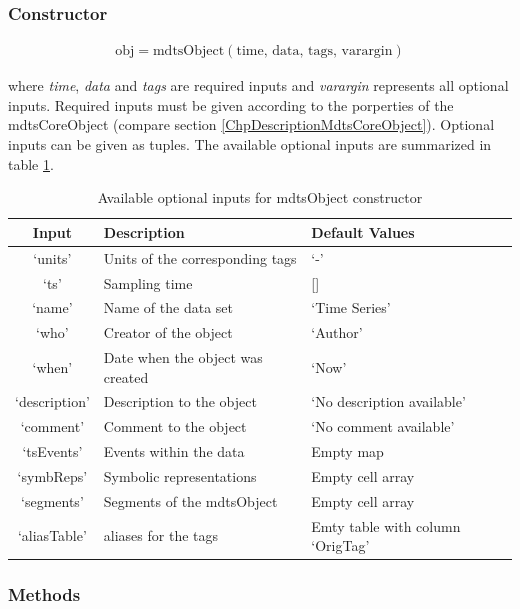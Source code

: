 \documentclass[a4]{scrreprt}
\begin{document}
\subsubsection{Constructor}

\begin{align*}
\text{obj} = \text{mdtsObject}(\text{time, }\text{data,  }\text{tags, }\text{varargin})
\end{align*}

where \textit{time}, \textit{data} and \textit{tags} are required inputs and \textit{varargin} represents all optional inputs. Required inputs must be given according to the porperties of the mdtsCoreObject (compare section \ref{ChpDescriptionMdtsCoreObject}). Optional inputs can be given as tuples. The available optional inputs are summarized in table \ref{TblMdtsConstructorInputs}.

\begin{table}[htbp]
	\centering
	\caption{Available optional inputs for mdtsObject constructor}
	\begin{tabular}{ | c | l | l |}
		\hline
		Input & Description & Default Values \\ \hline \hline
		`units' & Units of the corresponding tags & `-' \\ \hline
		`ts' & Sampling time & [] \\ \hline
		`name' & Name of the data set & `Time Series' \\ \hline
		`who' & Creator of the object & `Author' \\ \hline
		`when' & Date when the object was created & `Now' \\ \hline
		`description' & Description to the object & `No description available' \\ \hline
		`comment' & Comment to the object & `No comment available' \\ \hline
		`tsEvents' & Events within the data & Empty map \\ \hline
		`symbReps' & Symbolic representations & Empty cell array \\ \hline
		`segments' & Segments of the mdtsObject & Empty cell array \\ \hline
		`aliasTable' & aliases for the tags & Emty table with column `OrigTag'  \\ \hline
	\end{tabular}
	\label{TblMdtsConstructorInputs}
\end{table}

\subsubsection{Methods}
\end{document}

